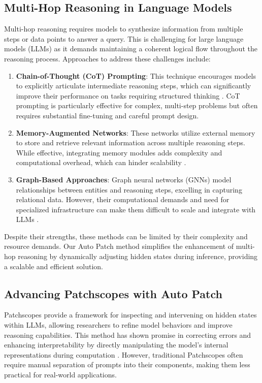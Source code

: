 \documentclass[11pt]{article}
\begin{document}
\subsection*{Multi-Hop Reasoning in Language Models}

Multi-hop reasoning requires models to synthesize information from multiple steps or data points to answer a query. This is challenging for large language models (LLMs) as it demands maintaining a coherent logical flow throughout the reasoning process. Approaches to address these challenges include:

\begin{enumerate}
    \item \textbf{Chain-of-Thought (CoT) Prompting}: This technique encourages models to explicitly articulate intermediate reasoning steps, which can significantly improve their performance on tasks requiring structured thinking \cite{wei2023chainofthought, zhang2022automatic}. CoT prompting is particularly effective for complex, multi-step problems but often requires substantial fine-tuning and careful prompt design.
    
    \item \textbf{Memory-Augmented Networks}: These networks utilize external memory to store and retrieve relevant information across multiple reasoning steps. While effective, integrating memory modules adds complexity and computational overhead, which can hinder scalability \cite{wang-etal-2023-towards}.
    
    \item \textbf{Graph-Based Approaches}: Graph neural networks (GNNs) model relationships between entities and reasoning steps, excelling in capturing relational data. However, their computational demands and need for specialized infrastructure can make them difficult to scale and integrate with LLMs \cite{decao2019question}.
\end{enumerate}

Despite their strengths, these methods can be limited by their complexity and resource demands. Our Auto Patch method simplifies the enhancement of multi-hop reasoning by dynamically adjusting hidden states during inference, providing a scalable and efficient solution.

\subsection*{Advancing Patchscopes with Auto Patch}

Patchscopes provide a framework for inspecting and intervening on hidden states within LLMs, allowing researchers to refine model behaviors and improve reasoning capabilities. This method has shown promise in correcting errors and enhancing interpretability by directly manipulating the model's internal representations during computation \cite{ghandeharioun2024patchscopes}. However, traditional Patchscopes often require manual separation of prompts into their components, making them less practical for real-world applications.
\end{document}
